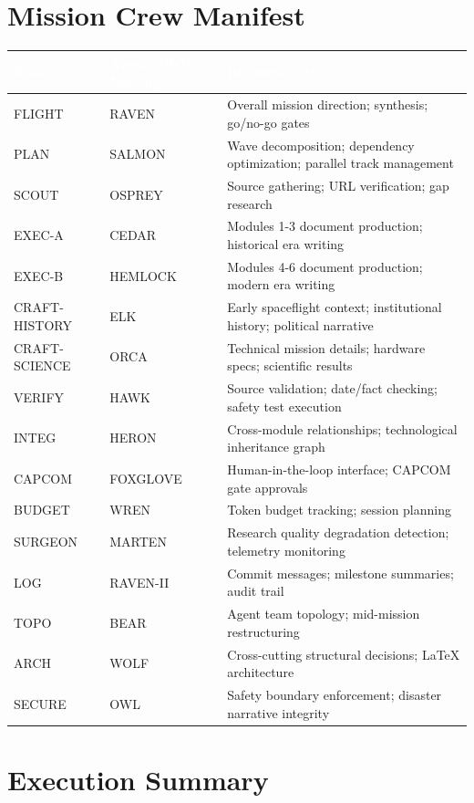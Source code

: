 \documentclass[11pt,letterpaper]{article}
\newcommand{\tableheader}[1]{\textbf{\sffamily\textcolor{white}{#1}}}
\begin{document}
\section{Mission Crew Manifest}

\begin{center}
\begin{tabularx}{\textwidth}{L{2cm}L{3cm}X}
\toprule
{}
\tableheader{Role} & \tableheader{Agent (PNW Naming)} & \tableheader{Responsibility} \\
\midrule
FLIGHT & RAVEN & Overall mission direction; synthesis; go/no-go gates \\
PLAN & SALMON & Wave decomposition; dependency optimization; parallel track management \\
SCOUT & OSPREY & Source gathering; URL verification; gap research \\
EXEC-A & CEDAR & Modules 1-3 document production; historical era writing \\
EXEC-B & HEMLOCK & Modules 4-6 document production; modern era writing \\
CRAFT-HISTORY & ELK & Early spaceflight context; institutional history; political narrative \\
CRAFT-SCIENCE & ORCA & Technical mission details; hardware specs; scientific results \\
VERIFY & HAWK & Source validation; date/fact checking; safety test execution \\
INTEG & HERON & Cross-module relationships; technological inheritance graph \\
CAPCOM & FOXGLOVE & Human-in-the-loop interface; CAPCOM gate approvals \\
BUDGET & WREN & Token budget tracking; session planning \\
SURGEON & MARTEN & Research quality degradation detection; telemetry monitoring \\
LOG & RAVEN-II & Commit messages; milestone summaries; audit trail \\
TOPO & BEAR & Agent team topology; mid-mission restructuring \\
ARCH & WOLF & Cross-cutting structural decisions; LaTeX architecture \\
SECURE & OWL & Safety boundary enforcement; disaster narrative integrity \\
\bottomrule
\end{tabularx}
\end{center}

\section{Execution Summary}
\end{document}
